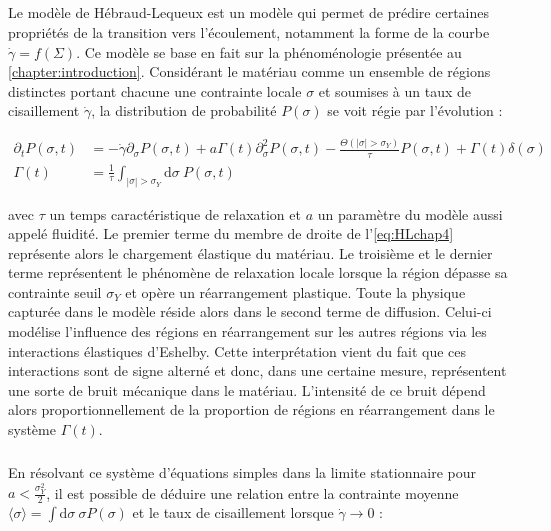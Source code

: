 \label{sec:HL_def}

\subparagraph{}Le modèle de Hébraud-Lequeux \cite{hebraud_mode_coupling_1998} est un modèle qui permet de prédire certaines propriétés de la transition vers l'écoulement, notamment la forme de la courbe $\dot{\gamma} = f(\Sigma)$. Ce modèle se base en fait sur la phénoménologie présentée au \autoref{chapter:introduction}. Considérant le matériau comme un ensemble de régions distinctes portant chacune une contrainte locale $\sigma$ et soumises à un taux de cisaillement $\dot{\gamma}$, la distribution de probabilité $P(\sigma)$ se voit régie par l'évolution :

\begin{equation}
\begin{aligned}
	\partial_t P(\sigma, t) &= -\dot{\gamma}\partial_\sigma P(\sigma, t) + a\Gamma(t)\partial_\sigma^2P(\sigma, t) - \frac{\Theta (|\sigma|>\sigma_Y)}{\tau}P(\sigma, t) + \Gamma(t)\delta(\sigma)\\
	\Gamma(t) &= \frac{1}{\tau}\int_{|\sigma|>\sigma_Y}\mathrm{d}\sigma ~ P(\sigma, t)
\end{aligned}
\label{eq:HLchap4}
\end{equation}

\noindent avec $\tau$ un temps caractéristique de relaxation et $a$ un paramètre du modèle aussi appelé fluidité. Le premier terme du membre de droite de l'\autoref{eq:HLchap4} représente alors le chargement élastique du matériau. Le troisième et le dernier terme représentent le phénomène de relaxation locale lorsque la région dépasse sa contrainte seuil $\sigma_Y$ et opère un réarrangement plastique. Toute la physique capturée dans le modèle réside alors dans le second terme de diffusion. Celui-ci modélise l'influence des régions en réarrangement sur les autres régions via les interactions élastiques d'Eshelby. Cette interprétation vient du fait que ces interactions sont de signe alterné et donc, dans une certaine mesure, représentent une sorte de bruit mécanique dans le matériau. L'intensité de ce bruit dépend alors proportionnellement de la proportion de régions en réarrangement dans le système $\Gamma (t)$.

\subparagraph{}En résolvant ce système d'équations simples dans la limite stationnaire pour $a < \frac{\sigma_Y^2}{2}$, il est possible de déduire une relation entre la contrainte moyenne $\langle \sigma \rangle =  \int \mathrm{d}\sigma ~ \sigma P(\sigma)$ et le taux de cisaillement lorsque $\dot{\gamma}\rightarrow 0$ \cite{olivier_fluides_2011, bertin_stochastic_2022} :

